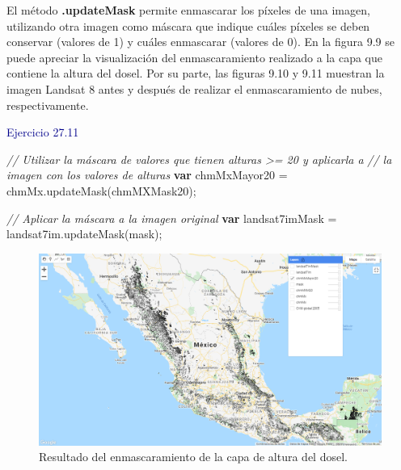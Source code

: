 \documentclass[
  12pt,
  letterpaper,
  twoside]{book}
\newenvironment{Shaded}{\begin{snugshade}}{\end{snugshade}}
\newcommand{\CommentTok}[1]{\textcolor[rgb]{0.24,0.58,0.00}{\textit{#1}}}
\newcommand{\ControlFlowTok}[1]{\textcolor[rgb]{0.00,0.00,0.00}{\textbf{#1}}}
\newcommand{\FunctionTok}[1]{\textcolor[rgb]{0.48,0.12,0.64}{#1}}
\newcommand{\NormalTok}[1]{#1}
\newcommand{\OperatorTok}[1]{\textcolor[rgb]{0.00,0.00,0.00}{#1}}
\newcommand\boldpurple[1]{\textcolor{darkpurple}{\textbf{#1}}}
\begin{document}
El método \boldpurple{.updateMask} permite enmascarar los píxeles de una imagen, utilizando otra imagen como máscara que indique cuáles píxeles se deben conservar (valores de 1) y cuáles enmascarar (valores de 0). En la figura 9.9 se puede apreciar la visualización del enmascaramiento realizado a la capa que contiene la altura del dosel. Por su parte, las figuras 9.10 y 9.11 muestran la imagen Landsat 8 antes y después de realizar el enmascaramiento de nubes, respectivamente.

\textcolor{darkblue}{Ejercicio 27.11}

\begin{Shaded}
\begin{Highlighting}[]
\CommentTok{// Utilizar la máscara de valores que tienen alturas \textgreater{}= 20 y aplicarla a }
\CommentTok{// la imagen con los valores de alturas}
\ControlFlowTok{var}\NormalTok{ chmMxMayor20 }\OperatorTok{=}\NormalTok{ chmMx}\OperatorTok{.}\FunctionTok{updateMask}\NormalTok{(chmMXMask20)}\OperatorTok{;}

\CommentTok{// Aplicar la máscara a la imagen original}
\ControlFlowTok{var}\NormalTok{ landsat7imMask }\OperatorTok{=}\NormalTok{ landsat7im}\OperatorTok{.}\FunctionTok{updateMask}\NormalTok{(mask)}\OperatorTok{;}
\end{Highlighting}
\end{Shaded}

\begin{figure}[H]

{\centering \includegraphics[width=0.95\linewidth]{Img/ej279} 

}

\caption{Resultado del enmascaramiento de la capa de altura del dosel.}\label{fig:unnamed-chunk-77}
\end{figure}
\end{document}

